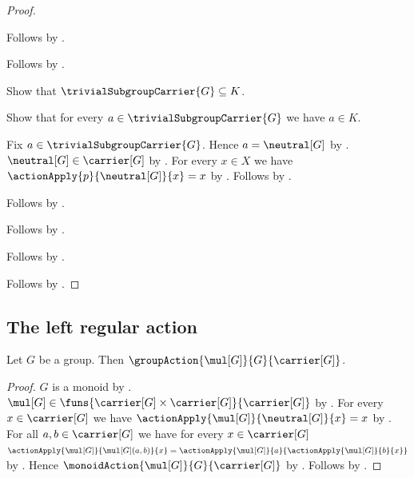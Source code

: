 \begin{proof}
\begin{subproof}
\begin{subproof}
\begin{subproof}
\begin{subproof}
                    Follows by
                        .
                \end{subproof}
                Follows by .
            \end{subproof}
            Show that $\trivialSubgroupCarrier{G}\subseteq K$.
            \begin{subproof}
                Show that for every $a\in\trivialSubgroupCarrier{G}$
                    we have $a\in K$.
                \begin{subproof}
                    Fix $a\in\trivialSubgroupCarrier{G}$.
                    Hence $a=\neutral[G]$ by
                        .
                    $\neutral[G]\in\carrier[G]$ by
                        .
                    For every $x\in X$ we have
                        $\actionApply{p}{\neutral[G]}{x}=x$ by
                        .
                    Follows by
                        .
                \end{subproof}
                Follows by .
            \end{subproof}
            Follows by .
        \end{subproof}
        Follows by .
    \end{subproof}
    Follows by \auto.
\end{proof}

\subsection{The left regular action}

\begin{theorem}\label{group_multiplication_action}
    Let $G$ be a group.
    Then $\groupAction{\mul[G]}{G}{\carrier[G]}$.
\end{theorem}
\begin{proof}
    $G$ is a monoid by .
    $\mul[G]\in
        \funs{\carrier[G]\times\carrier[G]}{\carrier[G]}$ by
        .
    For every $x\in\carrier[G]$ we have
        $\actionApply{\mul[G]}{\neutral[G]}{x}=x$ by
        .
    For all $a,b\in\carrier[G]$ we have for every
        $x\in\carrier[G]$
        $\actionApply{\mul[G]}{\mul[G](a,b)}{x}=
            \actionApply{\mul[G]}{a}{
                \actionApply{\mul[G]}{b}{x}}$ by
        .
    Hence $\monoidAction{\mul[G]}{G}{\carrier[G]}$ by
        .
    Follows by .
\end{proof}

